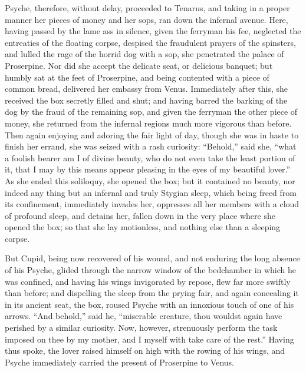 \documentclass[12pt]{article}
\begin{document}
Psyche, therefore, without delay, proceeded to Tenarus, and taking in a proper
manner her pieces of money and her sops, ran down the infernal avenue. Here,
having passed by the lame ass in silence, given the ferryman his fee, neglected
the entreaties of the floating corpse, despised the fraudulent prayers of the
spinsters, and lulled the rage of the horrid dog with a sop, she penetrated the
palace of Proserpine. Nor did she accept the delicate seat, or delicious
banquet; but humbly sat at the feet of Proserpine, and being contented with a
piece of common bread, delivered her embassy from Venus. Immediately after
this, she received the box secretly filled and shut; and having barred the
barking of the dog by the fraud of the remaining sop, and given the ferryman
the other piece of money, she returned from the infernal regions much more
vigorous than before. Then again enjoying and adoring the fair light of day,
though she was in haste to finish her errand, she was seized with a rash
curiosity: ``Behold,'' said she, ``what a foolish bearer am I of divine beauty,
who do not even take the least portion of it, that I may by this means appear
pleasing in the eyes of my beautiful lover.'' As she ended this soliloquy, she
opened the box; but it contained no beauty, nor indeed any thing but an
infernal and truly Stygian sleep, which being freed from its confinement,
immediately invades her, oppresses all her members with a cloud of profound
sleep, and detains her, fallen down in the very place where she opened the box;
so that she lay motionless, and nothing else than a sleeping corpse.

But Cupid, being now recovered of his wound, and not enduring the long absence
of his Psyche, glided through the narrow window of the bedchamber in which he
was confined, and having his wings invigorated by repose, flew far more swiftly
than before; and dispelling the sleep from the prying fair, and again
concealing it in its ancient seat, the box, roused Psyche with an innoxious
touch of one of his arrows. ``And behold,'' said he, ``miserable creature, thou
wouldst again have perished by a similar curiosity. Now, however, strenuously
perform the task imposed on thee by my mother, and I myself with take care of
the rest.'' Having thus spoke, the lover raised himself on high with the rowing
of his wings, and Psyche immediately carried the present of Proserpine to
Venus.
\end{document}
